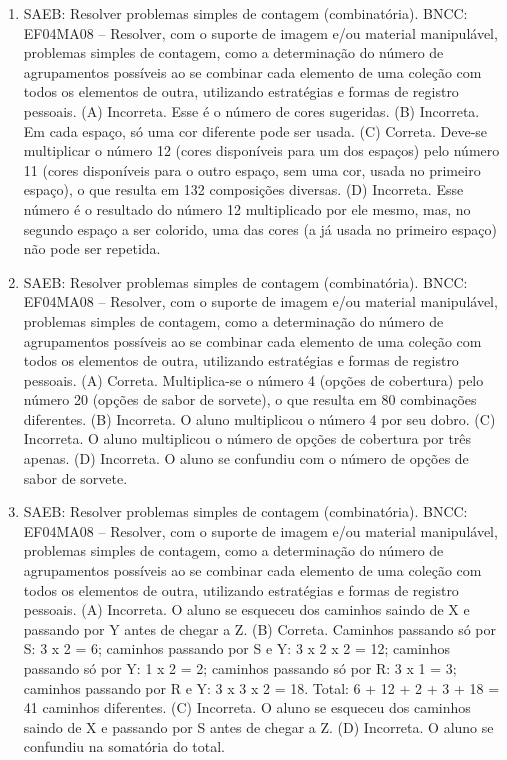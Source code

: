 \begin{enumerate}
\item
SAEB: Resolver problemas simples de contagem (combinatória).
BNCC: EF04MA08 -- Resolver, com o suporte de imagem e/ou material manipulável, problemas simples
de contagem, como a determinação do número de agrupamentos possíveis ao se combinar cada
elemento de uma coleção com todos os elementos de outra, utilizando estratégias e formas de
registro pessoais.
(A) Incorreta. Esse é o número de cores sugeridas.
(B) Incorreta. Em cada espaço, só uma cor diferente pode ser usada.
(C) Correta. Deve-se multiplicar o número 12 (cores disponíveis para um dos espaços) pelo número 11 (cores disponíveis para o outro espaço, sem uma cor, usada no primeiro espaço), o que resulta em 132 composições diversas.
(D) Incorreta. Esse número é o resultado do número 12 multiplicado por ele mesmo, mas, no segundo espaço a ser colorido, uma das cores (a já usada no primeiro espaço) não pode ser repetida.

\item
SAEB: Resolver problemas simples de contagem (combinatória).
BNCC: EF04MA08 -- Resolver, com o suporte de imagem e/ou material manipulável, problemas simples
de contagem, como a determinação do número de agrupamentos possíveis ao se combinar cada
elemento de uma coleção com todos os elementos de outra, utilizando estratégias e formas de
registro pessoais.
(A) Correta. Multiplica-se o número 4 (opções de cobertura) pelo número 20 (opções de sabor de sorvete), o que resulta em 80 combinações diferentes.
(B) Incorreta. O aluno multiplicou o número 4 por seu dobro.
(C) Incorreta. O aluno multiplicou o número de opções de cobertura por três apenas.
(D) Incorreta. O aluno se confundiu com o número de opções de sabor de sorvete.

\item
SAEB: Resolver problemas simples de contagem (combinatória).
BNCC: EF04MA08 -- Resolver, com o suporte de imagem e/ou material manipulável, problemas simples
de contagem, como a determinação do número de agrupamentos possíveis ao se combinar cada
elemento de uma coleção com todos os elementos de outra, utilizando estratégias e formas de
registro pessoais.
(A) Incorreta. O aluno se esqueceu dos caminhos saindo de X e passando por Y antes de chegar a Z.
(B) Correta. Caminhos passando só por S: 3 x 2 = 6; caminhos passando por S e Y: 3 x 2 x 2 = 12; caminhos passando só por Y: 1 x 2 = 2; caminhos passando só por R: 3 x 1 = 3; caminhos passando por R e Y: 3 x 3 x 2 = 18. Total: 6 + 12 + 2 + 3 + 18 = 41 caminhos diferentes.
(C) Incorreta. O aluno se esqueceu dos caminhos saindo de X e passando por S antes de chegar a Z.
(D) Incorreta. O aluno se confundiu na somatória do total.
\end{enumerate}

